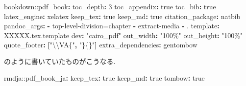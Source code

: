 \documentclass[
  xelatex,ja=standard,jafont=noto]{bxjsbook}
\newenvironment{Shaded}{\begin{snugshade}}{\end{snugshade}}
\newcommand{\AttributeTok}[1]{\textcolor[rgb]{0.77,0.63,0.00}{#1}}
\newcommand{\CharTok}[1]{\textcolor[rgb]{0.31,0.60,0.02}{#1}}
\newcommand{\DecValTok}[1]{\textcolor[rgb]{0.00,0.00,0.81}{#1}}
\newcommand{\FunctionTok}[1]{\textcolor[rgb]{0.00,0.00,0.00}{#1}}
\newcommand{\KeywordTok}[1]{\textcolor[rgb]{0.13,0.29,0.53}{\textbf{#1}}}
\newcommand{\SpecialCharTok}[1]{\textcolor[rgb]{0.00,0.00,0.00}{#1}}
\newcommand{\StringTok}[1]{\textcolor[rgb]{0.31,0.60,0.02}{#1}}
\theoremstyle{definition}
\theoremstyle{definition}
\theoremstyle{definition}
\theoremstyle{definition}
\theoremstyle{remark}
\begin{document}
\begin{Shaded}
\begin{Highlighting}[]
\AttributeTok{bookdown:}\FunctionTok{:pdf\_book}\KeywordTok{:}
\AttributeTok{  }\FunctionTok{toc\_depth}\KeywordTok{:}\AttributeTok{ }\DecValTok{3}
\AttributeTok{  }\FunctionTok{toc\_appendix}\KeywordTok{:}\AttributeTok{ }\CharTok{true}
\AttributeTok{  }\FunctionTok{toc\_bib}\KeywordTok{:}\AttributeTok{ }\CharTok{true}
\AttributeTok{  }\FunctionTok{latex\_engine}\KeywordTok{:}\AttributeTok{ xelatex}
\AttributeTok{  }\FunctionTok{keep\_tex}\KeywordTok{:}\AttributeTok{ }\CharTok{true}
\AttributeTok{  }\FunctionTok{keep\_md}\KeywordTok{:}\AttributeTok{ }\CharTok{true}
\AttributeTok{  }\FunctionTok{citation\_package}\KeywordTok{:}\AttributeTok{ natbib}
\AttributeTok{  }\FunctionTok{pandoc\_args}\KeywordTok{:}
\AttributeTok{    }\KeywordTok{{-}}\AttributeTok{ }\StringTok{\textquotesingle{}{-}{-}top{-}level{-}division=chapter\textquotesingle{}}
\AttributeTok{    }\KeywordTok{{-}}\AttributeTok{ }\StringTok{\textquotesingle{}{-}{-}extract{-}media\textquotesingle{}}
\AttributeTok{    }\KeywordTok{{-}}\AttributeTok{ }\StringTok{\textquotesingle{}.\textquotesingle{}}
\AttributeTok{  }\FunctionTok{template}\KeywordTok{:}\AttributeTok{ XXXXX.tex.template\textquotesingle{}}
\AttributeTok{  }\FunctionTok{dev}\KeywordTok{:}\AttributeTok{ }\StringTok{"cairo\_pdf"}
\AttributeTok{  }\FunctionTok{out\_width}\KeywordTok{:}\AttributeTok{ }\StringTok{"100\%"}
\AttributeTok{  }\FunctionTok{out\_height}\KeywordTok{:}\AttributeTok{ }\StringTok{"100\%"}
\AttributeTok{  }\FunctionTok{quote\_footer}\KeywordTok{:}\AttributeTok{ }\KeywordTok{[}\StringTok{"}\SpecialCharTok{\textbackslash{}\textbackslash{}}\StringTok{VA\{"}\KeywordTok{,}\AttributeTok{ }\StringTok{"\}\{\}"}\KeywordTok{]}
\AttributeTok{  }\FunctionTok{extra\_dependencies}\KeywordTok{:}\AttributeTok{ gentombow}
\end{Highlighting}
\end{Shaded}

のように書いていたものがこうなる.

\begin{Shaded}
\begin{Highlighting}[]
\AttributeTok{rmdja:}\FunctionTok{:pdf\_book\_ja}\KeywordTok{:}
\AttributeTok{  }\FunctionTok{keep\_tex}\KeywordTok{:}\AttributeTok{ }\CharTok{true}
\AttributeTok{  }\FunctionTok{keep\_md}\KeywordTok{:}\AttributeTok{ }\CharTok{true}
\AttributeTok{  }\FunctionTok{tombow}\KeywordTok{:}\AttributeTok{ }\CharTok{true}
\end{Highlighting}
\end{Shaded}
\end{document}
